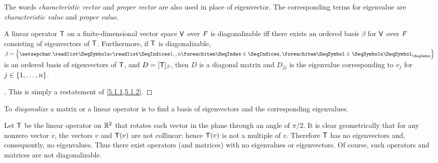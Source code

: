 \begin{note}
	The words \emph{characteristic vector} and \emph{proper vector} are also used in place of eigenvector.
	The corresponding terms for eigenvalue are \emph{characteristic value} and \emph{proper value}.
\end{note}

\begin{thm}\label{5.1}
	A linear operator \(\mathsf{T}\) on a finite-dimensional vector space \(\mathsf{V}\) over \(\mathit{F}\) is diagonalizable iff there exists an ordered basis \(\beta\) for \(\mathsf{V}\) over \(\mathit{F}\) consisting of eigenvectors of \(\mathsf{T}\).
	Furthermore, if \(\mathsf{T}\) is diagonalizable, \(\beta = \set{\seq{v}{1,,n}}\) is an ordered basis of eigenvectors of \(\mathsf{T}\), and \(D = [\mathsf{T}]_{\beta}\), then \(D\) is a diagonal matrix and \(D_{j j}\) is the eigenvalue corresponding to \(v_j\) for \(j \in \left\lbrace1, \dots, n\right\rbrace\).
\end{thm}

\begin{proof}[]
	This is simply a restatement of \cref{5.1.1,5.1.2}.
\end{proof}

\begin{note}
	To \emph{diagonalize} a matrix or a linear operator is to find a basis of eigenvectors and the corresponding eigenvalues.
\end{note}

\begin{eg}\label{5.1.3}
	Let \(\mathsf{T}\) be the linear operator on \(\mathbb{R}^2\) that rotates each vector in the plane through an angle of \(\pi / 2\).
	It is clear geometrically that for any nonzero vector \(v\), the vectors \(v\) and \(\mathsf{T}(v)\) are not collinear;
	hence \(\mathsf{T}(v)\) is not a multiple of \(v\).
	Therefore \(\mathsf{T}\) has no eigenvectors and, consequently, no eigenvalues.
	Thus there exist operators (and matrices) with no eigenvalues or eigenvectors.
	Of course, such operators and matrices are not diagonalizable.
\end{eg}

